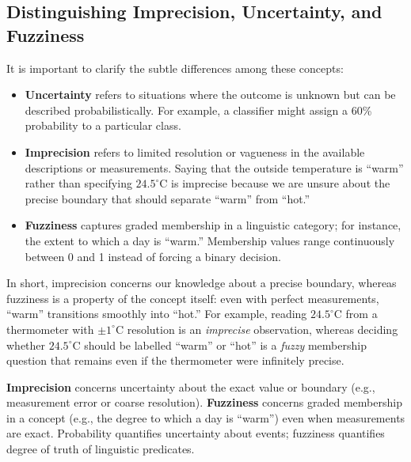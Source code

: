 \subsection{Distinguishing Imprecision, Uncertainty, and Fuzziness}
\label{sec:imprecision-fuzziness}

It is important to clarify the subtle differences among these concepts:
\begin{itemize}
    \item \textbf{Uncertainty} refers to situations where the outcome is unknown but can be described probabilistically. For example, a classifier might assign a 60\% probability to a particular class.

    \item \textbf{Imprecision} refers to limited resolution or vagueness in the available descriptions or measurements. Saying that the outside temperature is ``warm'' rather than specifying $24.5^\circ$C is imprecise because we are unsure about the precise boundary that should separate ``warm'' from ``hot.''

\item \textbf{Fuzziness} captures graded membership in a linguistic category; for instance, the extent to which a day is ``warm.'' Membership values range continuously between 0 and 1 instead of forcing a binary decision.

\end{itemize}
In short, imprecision concerns our knowledge about a precise boundary, whereas fuzziness is a property of the concept itself: even with perfect measurements, ``warm'' transitions smoothly into ``hot.''
For example, reading $24.5^\circ$C from a thermometer with $\pm 1^\circ$C resolution is an \emph{imprecise} observation, whereas deciding whether $24.5^\circ$C should be labelled ``warm'' or ``hot'' is a \emph{fuzzy} membership question that remains even if the thermometer were infinitely precise.
\begin{tcolorbox}[title={Imprecision vs. Fuzziness}, colback=gray!5, colframe=gray!40, boxrule=0.4pt]
\textbf{Imprecision} concerns uncertainty about the exact value or boundary (e.g., measurement error or coarse resolution). \textbf{Fuzziness} concerns graded membership in a concept (e.g., the degree to which a day is ``warm'') even when measurements are exact. Probability quantifies uncertainty about events; fuzziness quantifies degree of truth of linguistic predicates.
\end{tcolorbox}

